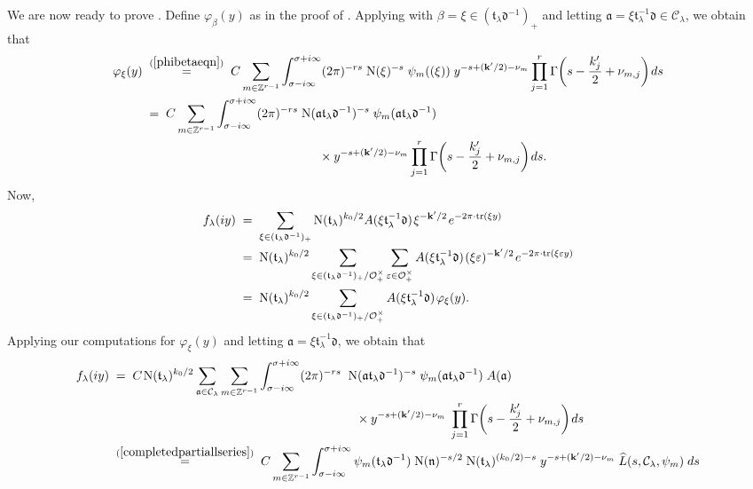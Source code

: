 \documentclass[11pt]{amsart}
\theoremstyle{remark}
\newcommand\mbf[1]{\mathbf{#1}}
\newcommand\cl[1]{\mathcal{#1}}
\newcommand\fr[1]{\mathfrak{#1}}
\newcommand\wh[1]{\widehat{#1}}
\newcommand{\inte}{\mathbb{Z}}
\newcommand{\eps}{\varepsilon}
\newcommand{\vphi}{\varphi}
\newcommand{\clo}{\mathcal{O}}
\newcommand{\eq}{\;=\;}
\def\thin{{\hskip 1pt}}
\newcommand{\N}{\mathrm{N}}
\newcommand{\tr}{\mathrm{tr}}
\begin{document}
We are now ready to prove . Define $\vphi_\beta(y)$ as in the proof of . Applying  with $\beta=\xi\in(\fr{t}_\lambda\fr{d}^{-1})_+$ and letting $\fr{a}=\xi\fr{t}_\lambda^{-1}\fr{d}\in\cl{C}_\lambda$, we obtain that
\begin{align*}
    \vphi_{\xi}(y)&\;\stackrel{(\ref{phibetaeqn})}{=}\;C\sum_{m\in\inte^{r-1}}\int_{\sigma-i\infty}^{\sigma+i\infty}(2\pi)^{-rs}\;\N(\xi)^{-s}\;\psi_m((\xi))\;y^{-s+(\mbf{k}^\prime/2)-\nu_m}\prod_{j=1}^r\Gamma\bigg(s-\frac{k_j^\prime}{2}+\nu_{m,j}\bigg)\thin ds \\
    &\eq C\sum_{m\in\inte^{r-1}}\int_{\sigma-i\infty}^{\sigma+i\infty}(2\pi)^{-rs}\;\N(\fr{a}\fr{t}_\lambda\fr{d}^{-1})^{-s}\;\psi_m(\fr{a}\fr{t}_\lambda\fr{d}^{-1}) \\
    &\hspace{5cm}\times y^{-s+(\mbf{k}^\prime/2)-\nu_m}\prod_{j=1}^r\Gamma\bigg(s-\frac{k_j^\prime}{2}+\nu_{m,j}\bigg)\thin ds.
\end{align*}
Now, 
\begin{align*}
    f_\lambda(iy)&\eq\sum_{\xi\in(\fr{t}_\lambda\fr{d}^{-1})_+}\N(\fr{t}_\lambda)^{k_0/2}A(\xi\fr{t}_\lambda^{-1}\fr{d})\thin\xi^{-\mbf{k}^\prime/2}\thin e^{-2\pi \cdot\tr(\xi y)} \\
    &\eq\N(\fr{t}_\lambda)^{k_0/2}\sum_{\xi\in(\fr{t}_\lambda\fr{d}^{-1})_+/\clo_+^\times}\sum_{\eps\in\clo_+^\times}A(\xi\fr{t}_\lambda^{-1}\fr{d})\thin(\xi\eps)^{-\mbf{k}^\prime/2}\thin e^{-2\pi \cdot\tr(\xi\eps y)} \\
    &\eq\N(\fr{t}_\lambda)^{k_0/2}\sum_{\xi\in(\fr{t}_\lambda\fr{d}^{-1})_+/\clo_+^\times}A(\xi\fr{t}_\lambda^{-1}\fr{d})\thin\vphi_\xi(y).
\end{align*}
Applying our computations for $\vphi_\xi(y)$ and letting $\fr{a}=\xi\fr{t}_\lambda^{-1}\fr{d}$, we obtain that
\begin{align}
    f_\lambda(iy)&\eq C\thin\N(\fr{t}_\lambda)^{k_0/2}\sum_{\fr{a}\in\cl{C}_\lambda}\sum_{m\in\inte^{r-1}}\int_{\sigma-i\infty}^{\sigma+i\infty}(2\pi)^{-rs}\;\;\N(\fr{a}\fr{t}_\lambda\fr{d}^{-1})^{-s}\;\psi_m(\fr{a}\fr{t}_\lambda\fr{d}^{-1})\;A(\fr{a}) \nonumber \\
    &\hspace{7cm}\times y^{-s+(\mbf{k}^\prime/2)-\nu_m}\;\prod_{j=1}^r\Gamma\bigg(s-\frac{k_j^\prime}{2}+\nu_{m,j}\bigg)\thin ds \nonumber \\
    &\;\stackrel{(\ref{completedpartiallseries})}{=}\; C\sum_{m\in\inte^{r-1}}\int_{\sigma-i\infty}^{\sigma+i\infty}\psi_{m}(\fr{t}_\lambda\fr{d}^{-1})\;\N(\fr{n})^{-s/2}\;\N(\fr{t}_\lambda)^{(k_0/2)-s}\;y^{-s+(\mbf{k}^\prime/2)-\nu_m}\;\wh{L}(s,\cl{C}_\lambda,\psi_m)\; ds \label{flambdaiy}
\end{align}
\end{document}
